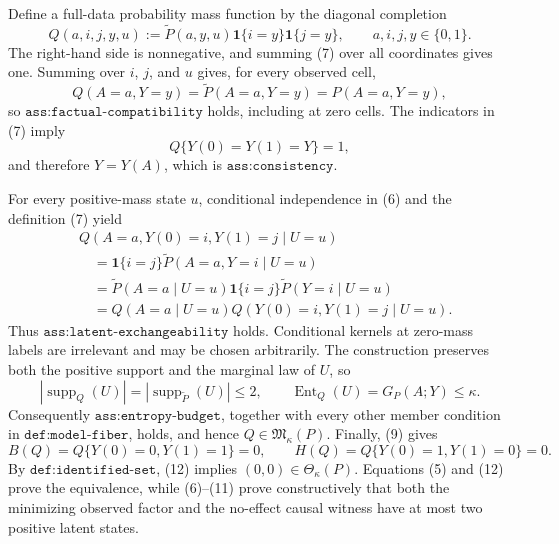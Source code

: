 Define a full-data probability mass function by the diagonal completion
\[
Q(a,i,j,y,u)
:=\widetilde P(a,y,u)\mathbf 1\{i=y\}\mathbf 1\{j=y\},
\qquad a,i,j,y\in\{0,1\}.
\tag{7}
\]
The right-hand side is nonnegative, and summing (7) over all coordinates gives one. Summing over \(i\), \(j\), and \(u\) gives, for every observed cell,
\[
Q(A=a,Y=y)=\widetilde P(A=a,Y=y)=P(A=a,Y=y),
\tag{8}
\]
so \(\texttt{ass:factual-compatibility}\) holds, including at zero cells. The indicators in (7) imply
\[
Q\{Y(0)=Y(1)=Y\}=1,
\tag{9}
\]
and therefore \(Y=Y(A)\), which is \(\texttt{ass:consistency}\).

For every positive-mass state \(u\), conditional independence in (6) and the definition (7) yield
\[
\begin{aligned}
&Q(A=a,Y(0)=i,Y(1)=j\mid U=u)\\
&\quad=\mathbf 1\{i=j\}\widetilde P(A=a,Y=i\mid U=u)\\
&\quad=\widetilde P(A=a\mid U=u)
  \mathbf 1\{i=j\}\widetilde P(Y=i\mid U=u)\\
&\quad=Q(A=a\mid U=u)
  Q(Y(0)=i,Y(1)=j\mid U=u).
\end{aligned}
\tag{10}
\]
Thus \(\texttt{ass:latent-exchangeability}\) holds. Conditional kernels at zero-mass labels are irrelevant and may be chosen arbitrarily. The construction preserves both the positive support and the marginal law of \(U\), so
\[
|\operatorname{supp}_{Q}(U)|
=|\operatorname{supp}_{\widetilde P}(U)|\leq2,
\qquad
\operatorname{Ent}_{Q}(U)=G_P(A;Y)\leq\kappa.
\tag{11}
\]
Consequently \(\texttt{ass:entropy-budget}\), together with every other member condition in \(\texttt{def:model-fiber}\), holds, and hence \(Q\in\mathfrak M_\kappa(P)\). Finally, (9) gives
\[
B(Q)=Q\{Y(0)=0,Y(1)=1\}=0,
\qquad
H(Q)=Q\{Y(0)=1,Y(1)=0\}=0.
\tag{12}
\]
By \(\texttt{def:identified-set}\), (12) implies \((0,0)\in\Theta_\kappa(P)\). Equations (5) and (12) prove the equivalence, while (6)--(11) prove constructively that both the minimizing observed factor and the no-effect causal witness have at most two positive latent states.